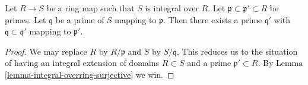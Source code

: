 \begin{lemma}
\label{lemma-integral-going-up}
Let $R \to S$ be a ring map such that
$S$ is integral over $R$.
Let $\mathfrak p \subset \mathfrak p' \subset R$
be primes. Let $\mathfrak q$ be a prime of $S$ mapping
to $\mathfrak p$. Then there exists a prime $\mathfrak q'$
with $\mathfrak q \subset \mathfrak q'$
mapping to $\mathfrak p'$.
\end{lemma}

\begin{proof}
We may replace $R$ by $R/\mathfrak p$ and $S$ by $S/\mathfrak q$.
This reduces us to the situation of having an integral
extension of domains $R \subset S$ and a prime $\mathfrak p' \subset R$.
By Lemma \ref{lemma-integral-overring-surjective} we win.
\end{proof}